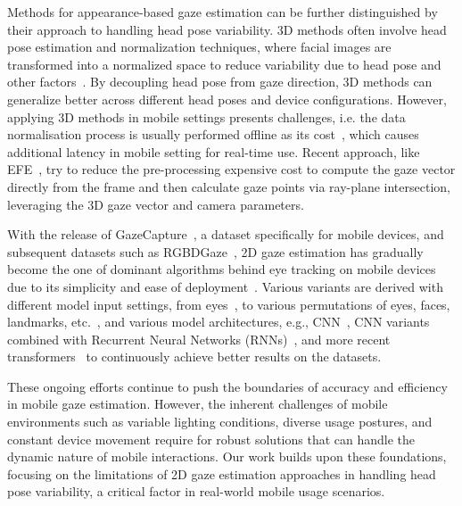 Methods for appearance-based gaze estimation can be further distinguished by their approach to handling head pose variability. 3D methods often involve head pose estimation and normalization techniques, where facial images are transformed into a normalized space to reduce variability due to head pose and other factors~\cite{zhang2018revisiting, zhang19mpiigaze}. By decoupling head pose from gaze direction, 3D methods can generalize better across different head poses and device configurations. However, applying 3D methods in mobile settings presents challenges, i.e. the data normalisation process is usually performed offline as its cost~\cite{park2019few}, which causes additional latency in mobile setting for real-time use. Recent approach, like EFE~\cite{balim2023efe}, try to reduce the pre-processing expensive cost to compute the gaze vector directly from the frame and then calculate gaze points via ray-plane intersection, leveraging the 3D gaze vector and camera parameters.


With the release of GazeCapture~\cite{krafka2016eye}, a dataset specifically for mobile devices, and subsequent datasets such as RGBDGaze~\cite{arakawa2022rgbdgaze}, 2D gaze estimation has gradually become the one of dominant algorithms behind eye tracking on mobile devices due to its simplicity and ease of deployment~\cite{lei2023end, cheng2024benchmark}. Various variants are derived with different model input settings, from eyes~\cite{valliappan2020accelerating}, to various permutations of eyes, faces, landmarks, etc.~\cite{krafka2016eye, huang2022gazeattentionnet, bao2021adaptive, huynh2021imon}, and various model architectures, e.g., CNN~\cite{zhang2015appearance,zhang2017fullface, krafka2016eye}, CNN variants combined with Recurrent Neural Networks (RNNs)~\cite{palmero2019recurrent,kellnhofer2019gaze360}, and more recent transformers~\cite{cheng2022gaze} to continuously achieve better results on the datasets. 

These ongoing efforts continue to push the boundaries of accuracy and efficiency in mobile gaze estimation. However, the inherent challenges of mobile environments such as variable lighting conditions, diverse usage postures, and constant device movement require for robust solutions that can handle the dynamic nature of mobile interactions. Our work builds upon these foundations, focusing on the limitations of 2D gaze estimation approaches in handling head pose variability, a critical factor in real-world mobile usage scenarios.


